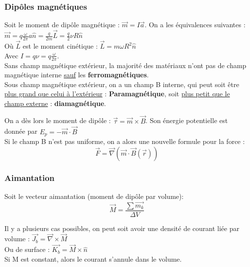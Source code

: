 \documentclass[../main.tex]{subfiles}
\begin{document}
\subsubsection{Dipôles magnétiques}
Soit le moment de dipôle magnétique : $\vec{m} = I\vec{a}$. On a les équivalences suivantes :\\
$\vec{m} = q\frac{\omega}{2\pi}a \hat{n} = \frac{q}{2m} \vec{L} = \frac{q}{2}\nu R \hat{n}$\\
Où $\vec{L}$ est le moment cinétique : $\vec{L} = m\omega R^2 \hat{n}$\\

Avec $I = q\nu = q\frac{\omega}{2\pi}$.\\

Sans champ magnétique extérieur, la majorité des matériaux n'ont pas de champ magnétique interne \underline{sauf} les \textbf{ferromagnétiques}.\\
Sous champ magnétique extérieur, on a un champ B interne, qui peut soit être \underline{plus grand que celui à l'extérieur} : \textbf{Paramagnétique}, soit \underline{plus petit que le champ externe} : \textbf{diamagnétique}. 

On a dès lors le moment de dipôle : $\vec{\tau} = \vec{m} \times \vec{B}$. Son énergie potentielle est donnée par $E_p = -\vec{m}\cdot \vec{B}$\\

\warning Si le champ B n'est pas uniforme, on a alors une nouvelle formule pour la force :\\
\begin{equation}
    \vec{F} = \vec{\nabla} (\vec{m} \cdot \vec{B}(\vec{r}))
\end{equation}

\subsubsection{Aimantation}
Soit le vecteur aimantation (moment de dipôle par volume):\\
\begin{equation}
    \vec{M} = \frac{\sum \vec{m_k}}{\Delta V }
\end{equation}

Il y a plusieurs cas possibles, on peut soit avoir une densité de courant liée par volume : $\vec{J_b} = \vec{\nabla} \times \vec{M}$\\
Ou de surface : $\vec{K_b} = \vec{M} \times \hat{n}$\\
Si M est constant, alors le courant s'annule dans le volume.\\
\end{document}
